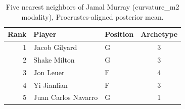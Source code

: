\begin{table}[htbp]
  \centering\small
  \begin{tabular}{rllc}
    \toprule
    Rank & Player & Position & Archetype \\
    \midrule
    1 & Jacob Gilyard & G & 3 \\
    2 & Shake Milton & G & 3 \\
    3 & Jon Leuer & F & 4 \\
    4 & Yi Jianlian & F & 3 \\
    5 & Juan Carlos Navarro & G & 1 \\
    \bottomrule
  \end{tabular}
  \caption{Five nearest neighbors of Jamal Murray (curvature_m2 modality), Procrustes-aligned posterior mean.}
  \label{tab:Jamal_Murray_neighbors_curvature_m2}
\end{table}

